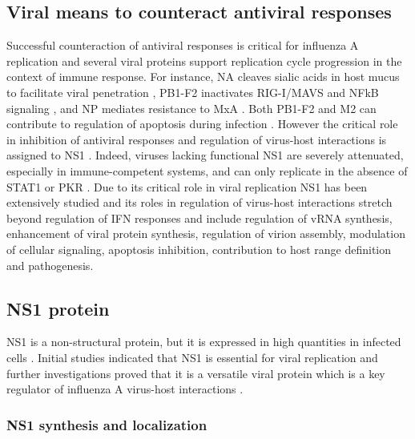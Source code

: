 		
	\subsection{Viral means to counteract antiviral responses}
	
	Successful counteraction of antiviral responses is critical for influenza A replication and several viral proteins support replication cycle progression in the context of immune response. For instance, \gls{NA} cleaves sialic acids in host mucus to facilitate viral penetration \parencite{Cohen2013}, \gls{PB1}-F2 inactivates \gls{RIG-I}/\gls{MAVS} and \gls{NFkB} signaling \parencite{Varga2011a, Dudek2011, Reis2013}, and \gls{NP} mediates resistance to \gls{MxA} \parencite{Dittmann2008}. Both \gls{PB1}-F2 and \gls{M2} can contribute to regulation of apoptosis during infection \parencite{Herold2012}. However the critical role in inhibition of antiviral responses and regulation of virus-host interactions is assigned to \gls{NS1} \parencite{Garcia-Sastre1998}. Indeed, viruses lacking functional \gls{NS1} are severely attenuated, especially in immune-competent systems, and can only replicate in the absence of \gls{STAT}1 or \gls{PKR} \parencite{Garcia-Sastre1998, Egorov1998, Donelan2003, Falcon2004}. Due to its critical role in viral replication \gls{NS1} has been extensively studied and its roles in regulation of virus-host interactions stretch beyond regulation of \gls{IFN} responses and include regulation of vRNA synthesis, enhancement of viral protein synthesis, regulation of virion assembly, modulation of cellular signaling, apoptosis inhibition, contribution to host range definition and pathogenesis. 
		
	\subsection{NS1 protein}
		
		\gls{NS1} is a non-structural protein, but it is expressed in high quantities in infected cells \parencite{Ritchey1976}. Initial studies indicated that \gls{NS1} is essential for viral replication \parencite{Koennecke1981} and further investigations proved that it is a versatile viral protein which is a key regulator of influenza A virus-host interactions \parencite{Ayllon2015}.
		
		\subsubsection{NS1 synthesis and localization}
		
